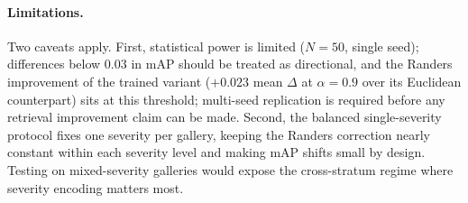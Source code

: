 \paragraph{Limitations.}
Two caveats apply. First, statistical power is limited ($N\!=\!50$, single seed); differences below $0.03$ in mAP should be treated as directional, and the Randers improvement of the trained variant ($+0.023$ mean $\Delta$ at $\alpha\!=\!0.9$ over its Euclidean counterpart) sits at this threshold; multi-seed replication is required before any retrieval improvement claim can be made. Second, the balanced single-severity protocol fixes one severity per gallery, keeping the Randers correction nearly constant within each severity level and making mAP shifts small by design. Testing on mixed-severity galleries would expose the cross-stratum regime where severity encoding matters most.

